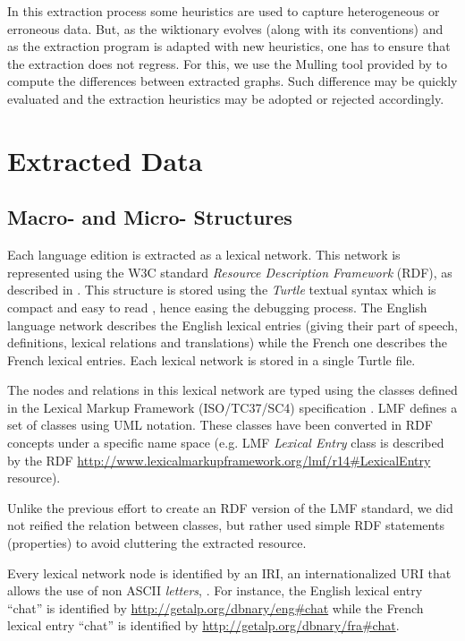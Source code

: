 \documentclass[10pt, a4paper]{article}
\begin{document}
In this extraction process some heuristics are used to capture heterogeneous or erroneous data. But, as the wiktionary evolves (along with its conventions) and as the extraction program is adapted with new heuristics, one has to ensure that the extraction does not regress. For this, we use the Mulling tool provided by \cite{archer:2010} to compute the differences between extracted graphs. Such difference may be quickly evaluated and the extraction heuristics may be adopted or rejected accordingly.

\section{Extracted Data}

\subsection{Macro- and Micro- Structures}

Each language edition is extracted as a lexical network. This network is represented using the W3C standard \emph{Resource Description Framework} (RDF), as described in \cite{Klyne_Carroll_2004}. This structure is stored using the \emph{Turtle} textual syntax which is compact and easy to read \cite{Beckett06}, hence easing the debugging process. The English language network describes the English lexical entries (giving their part of speech, definitions, lexical relations and translations) while the French one describes the French lexical entries. Each lexical network is stored in a single Turtle file. 

The nodes and relations in this lexical network are typed using the classes defined in the Lexical Markup Framework (ISO/TC37/SC4) specification \cite{LMF-ISO,FRANCOPOULO:2006:INRIA-00121468:1}. LMF defines a set of classes using UML notation. These classes have been converted in RDF concepts under a specific name space (e.g. LMF \emph{Lexical Entry} class is described by the RDF \url{http://www.lexicalmarkupframework.org/lmf/r14\#LexicalEntry} resource).

Unlike the previous effort to create an RDF version of the LMF standard, we did not reified the relation between classes, but rather used simple RDF statements (properties) to avoid cluttering the extracted resource.

Every lexical network node is identified by an IRI, an internationalized URI that allows the use of non ASCII \emph{letters}, \cite{IRI-RFC3987}. For instance, the English lexical entry ``chat'' is identified by \url{http://getalp.org/dbnary/eng#chat} while the French lexical entry ``chat'' is identified by \url{http://getalp.org/dbnary/fra#chat}. 
\end{document}
